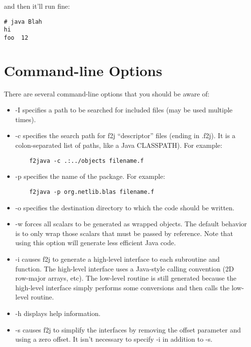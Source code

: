 \documentclass[11pt]{article}
\begin{document}
and then it'll run fine:

\begin{verbatim}
# java Blah
hi
foo  12
\end{verbatim}

\section{Command-line Options}

There are several command-line options that you should be aware of: 

\begin{itemize}
\item -I specifies a path to be searched for included files (may be used
  multiple times).

\item -c specifies the search path for f2j ``descriptor'' files (ending in .f2j).
  It is a colon-separated list of paths, like a Java CLASSPATH).  For example:
\begin{verbatim}
    f2java -c .:../objects filename.f
\end{verbatim}

\item -p specifies the name of the package.  For example:
\begin{verbatim}
    f2java -p org.netlib.blas filename.f
\end{verbatim}

\item -o specifies the destination directory to which the code should be
  written.

\item -w forces all scalars to be generated as wrapped objects.  The default
  behavior is to only wrap those scalars that must be passed by reference.
  Note that using this option will generate less efficient Java code.

\item -i causes f2j to generate a high-level interface to each subroutine and
  function.  The high-level interface uses a Java-style calling convention (2D
  row-major arrays, etc).  The low-level routine is still generated because the
  high-level interface simply performs some conversions and then calls the
  low-level routine.

\item -h displays help information.

\item -s causes f2j to simplify the interfaces by removing the offset parameter and
  using a zero offset.  It isn't necessary to specify -i in addition to -s.


\end{itemize}
\end{document}
